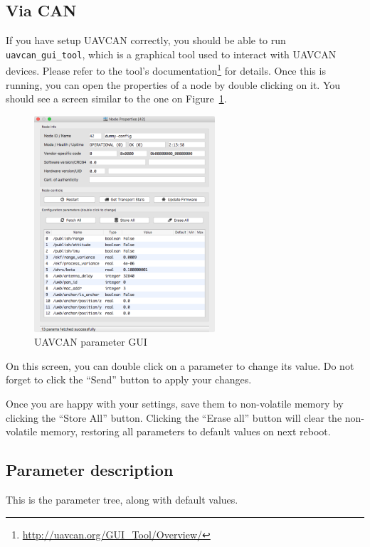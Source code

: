 \subsection{Via CAN}\label{via-can}

If you have setup UAVCAN correctly, you should be able to run
\texttt{uavcan\_gui\_tool}, which is a graphical tool used to interact
with UAVCAN devices. Please refer to
the tool's documentation\footnote{\url{http://uavcan.org/GUI_Tool/Overview/}}
for details. Once this is running, you can open the properties of a node
by double clicking on it. You should see a screen similar to the one on Figure~\ref{fig:gui-param}.

\begin{figure}
\centering
\includegraphics[width=0.60000\textwidth]{figures/uavcan_gui.png}
\caption{UAVCAN parameter GUI\label{fig:gui-param}}
\end{figure}

On this screen, you can double click on a parameter to change its value.
Do not forget to click the ``Send'' button to apply your changes.

Once you are happy with your settings, save them to non-volatile memory
by clicking the ``Store All'' button. Clicking the ``Erase all'' button
will clear the non-volatile memory, restoring all parameters to default
values on next reboot.

\subsection{Parameter description}\label{parameter-description}

This is the parameter tree, along with default values.

